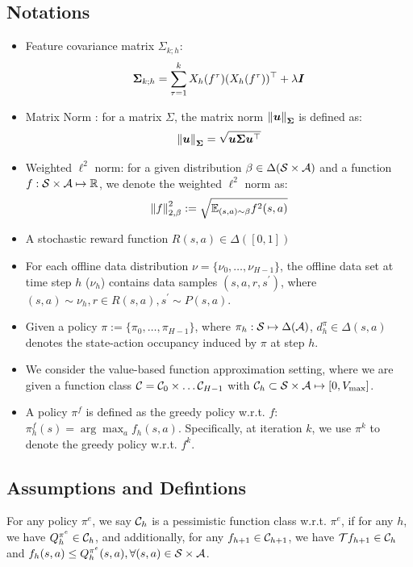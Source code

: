 \subsection{Notations}
\label{appendix:notations}
\begin{itemize}
    \item Feature covariance matrix $\Sigma_{k;h}$: 
    \begin{equation}
    \label{eq:covariance-matrix}
        \boldsymbol \Sigma_{k;h}=\sum_{\tau=1}^kX_h(f^\tau)(X_h(f^\tau))^\top+\lambda \boldsymbol I
    \end{equation}
    \item Matrix Norm \citet{zanette2021provable}: for a matrix $\Sigma$, the matrix norm $\left\| \boldsymbol u \right\|_{\boldsymbol \Sigma}$ is defined as:
    \begin{equation}
        \left\| \boldsymbol u \right\|_{\boldsymbol \Sigma}=\sqrt{\boldsymbol u\boldsymbol \Sigma \boldsymbol u^\top}
    \end{equation}
    \item Weighted $\ell^2$ norm: for a given distribution $\beta\in\Delta(\mathcal S\times \mathcal A)$ and a function $f:\mathcal S\times \mathcal A\mapsto \mathbb R$, we denote the weighted $\ell^2$ norm as:
    \begin{equation}
        \left\| f \right\|_{2,\beta}^2:=\sqrt{\mathbb E_{(s,a)\sim \beta}f^2(s,a)}
    \end{equation}
    \item A stochastic reward function $R(s,a)\in \Delta([0,1])$
    \item For each offline data distribution $\nu = \{\nu_0,\dots,\nu_{H-1}\}$, the offline data set at time step $h$ ($\nu_h$) contains data samples $(s,a,r,s^\prime)$, where $(s,a)\sim\nu_h,r\in R(s,a),s^\prime\sim P(s,a)$.
    \item Given a policy $\pi:=\{\pi_0,\dots,\pi_{H-1}\}$, where $\pi_h:\mathcal S\mapsto \Delta (\mathcal A)$, $d^\pi_h\in\Delta(s,a)$ denotes the state-action occupancy induced by $\pi$ at step $h$.
    \item We consider the value-based function approximation setting, where we are given a function class $\mathcal C=\mathcal C_0\times\dots\mathcal C_{H-1}$ with $\mathcal C_{h}\subset\mathcal S\times \mathcal A\mapsto[0, V_{\max}]$.
    \item A policy $\pi^f$ is defined as the greedy policy w.r.t. $f$: $\pi_h^f(s)=\arg\max_af_h(s,a)$. Specifically, at iteration $k$, we use $\pi^k$ to denote the greedy policy w.r.t. $f^k$.
\end{itemize}


\subsection{Assumptions and Defintions}
\label{subsec:CalQL-assumptions}
\begin{assumption} 
\label{assump:conservative-realizability-completeness}
For any policy $\pi^e$, we say $\mathcal C_h$ is a pessimistic function class w.r.t. $\pi^e$, if for any $h$, we have $Q^{\pi^e}_h\in \mathcal C_h$, and additionally, for any $f_{h+1}\in \mathcal C_{h+1}$, we have $\mathcal T f_{h+1}\in \mathcal C_h$ and $f_h(s,a)\leq Q_h^{\pi^e}(s,a),\forall (s,a)\in \mathcal S\times \mathcal A$.
\end{assumption}

